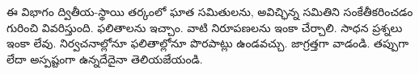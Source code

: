 \documentclass[../../../include/open-logic-chapter]{subfiles}
\begin{document}

\begin{editorial}
ఈ విభాగం ద్వితీయ-స్థాయి తర్కంలో ఘాత సమితులను, అవిచ్ఛిన్న సమితిని
సంకేతీకరించడం గురించి వివరిస్తుంది. ఫలితాలను ఇచ్చాం. వాటి నిరూపణలను
ఇంకా చేర్చాలి. సాధన ప్రశ్నలు ఇంకా లేవు. నిర్వచనాల్లోనూ ఫలితాల్లోనూ
పొరపాట్లు ఉండవచ్చు. జాగ్రత్తగా వాడండి. తప్పుగా లేదా అస్పష్టంగా
ఉన్నదేదైనా తెలియజేయండి.
\end{editorial}





\OLEndChapterHook
\end{document}
